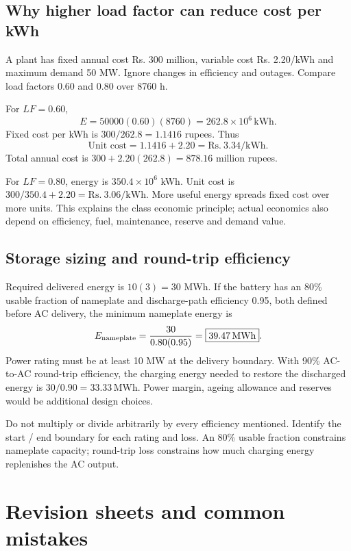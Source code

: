 \documentclass[11pt,a4paper]{article}
\newenvironment{Worked}[1]{\begin{tcolorbox}[breakable=false,colback=white,colframe=teal,colbacktitle=pale,coltitle=ink,title={#1}]}{\end{tcolorbox}}
\newcommand{\chapterstart}[2]{\clearpage\section{#1}\label{#2}}
\begin{document}
\subsection{Why higher load factor can reduce cost per kWh}
\begin{Worked}{Extension: fixed annual cost and the effect of utilisation}
A plant has fixed annual cost Rs. 300 million, variable cost Rs. 2.20/kWh and maximum demand 50 MW. Ignore changes in efficiency and outages. Compare load factors 0.60 and 0.80 over 8760 h.
\end{Worked}
For $LF=0.60$,
\[
E=50000(0.60)(8760)=262.8\times10^6\,\mathrm{kWh}.
\]
Fixed cost per kWh is $300/262.8=1.1416$ rupees. Thus
\[
\text{Unit cost}=1.1416+2.20=\boxed{\mathrm{Rs.}\ 3.34/\mathrm{kWh}}.
\] Total annual cost is $300+2.20(262.8)=878.16$ million rupees.

For $LF=0.80$, energy is $350.4\times10^6$ kWh. Unit cost is $300/350.4+2.20=\boxed{\mathrm{Rs.}\ 3.06/\mathrm{kWh}}$. More useful energy spreads fixed cost over more units. This explains the class economic principle; actual economics also depend on efficiency, fuel, maintenance, reserve and demand value.

\subsection{Storage sizing and round-trip efficiency}
\begin{Worked}{Extension: cover a 10 MW deficit for 3 h}
Required delivered energy is $10(3)=30$ MWh. If the battery has an 80\% usable fraction of nameplate and discharge-path efficiency 0.95, both defined before AC delivery, the minimum nameplate energy is
\[
E_{\rm nameplate}=\frac{30}{0.80(0.95)}=\boxed{39.47\,\mathrm{MWh}}.
\]
Power rating must be at least 10 MW at the delivery boundary. With 90\% AC-to-AC round-trip efficiency, the charging energy needed to restore the discharged energy is $30/0.90=\boxed{33.33\,\mathrm{MWh}}$. Power margin, ageing allowance and reserves would be additional design choices.
\end{Worked}
Do not multiply or divide arbitrarily by every efficiency mentioned. Identify the start / end boundary for each rating and loss. An 80\% usable fraction constrains nameplate capacity; round-trip loss constrains how much charging energy replenishes the AC output.

\chapterstart{Revision sheets and common mistakes}{revision}
\end{document}
